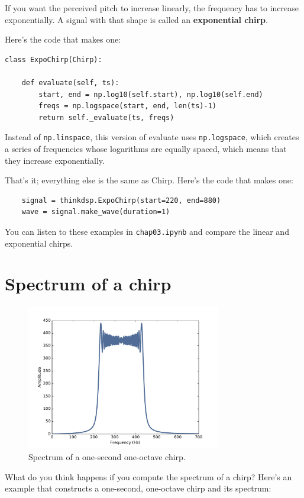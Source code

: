 \documentclass[12pt]{book}
\begin{document}
If you want the perceived pitch to increase linearly, the frequency
has to increase exponentially.  A signal with that shape is called
an {\bf exponential chirp}.

Here's the code that makes one:

\begin{verbatim}
class ExpoChirp(Chirp):
    
    def evaluate(self, ts):
        start, end = np.log10(self.start), np.log10(self.end)
        freqs = np.logspace(start, end, len(ts)-1)
        return self._evaluate(ts, freqs)
\end{verbatim}

Instead of {\tt np.linspace}, this version of evaluate uses
{\tt np.logspace}, which creates a series of frequencies
whose logarithms are equally spaced, which means that they increase
exponentially.

That's it; everything else is the same as Chirp.  Here's the code
that makes one:

\begin{verbatim}
    signal = thinkdsp.ExpoChirp(start=220, end=880)
    wave = signal.make_wave(duration=1)
\end{verbatim}

You can listen to these examples in {\tt chap03.ipynb} and compare
the linear and exponential chirps.  


\section{Spectrum of a chirp}
\label{sauron}

\begin{figure}
\centerline{\includegraphics[height=2.5in]{figs/chirp1.pdf}}
\caption{Spectrum of a one-second one-octave chirp.}
\label{fig.chirp1}
\end{figure}

What do you think happens if you compute the spectrum of a chirp?
Here's an example that constructs a one-second, one-octave chirp and
its spectrum:
\end{document}
